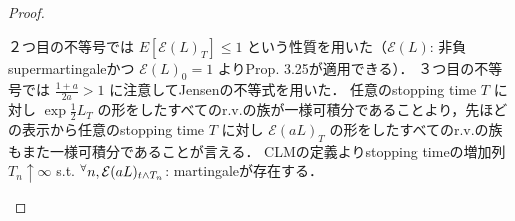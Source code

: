\documentclass{jsarticle}
\begin{document}
\begin{proof}
\begin{description}
        ２つ目の不等号では $E[\mathcal{E}(L)_T]\le1$ という性質を用いた（$\mathcal{E}(L)$: 非負supermartingaleかつ $\mathcal{E}(L)_0=1$ よりProp. 3.25が適用できる）．
        ３つ目の不等号では $\frac{1+a}{2a}>1$ に注意してJensenの不等式を用いた．
        任意のstopping time $T$ に対し $\exp\frac{1}{2}L_T$ の形をしたすべてのr.v.の族が一様可積分であることより，先ほどの表示から任意のstopping time $T$ に対し $\mathcal{E}(aL)_T$ の形をしたすべてのr.v.の族もまた一様可積分であることが言える．
        CLMの定義よりstopping timeの増加列 $T_n\uparrow\infty$ s.t. ${}^{\forall} n,\mathcal{E}(aL)_{t\wedge T_n}$: martingaleが存在する．
        
    \end{description}
\end{proof}
\end{document}
